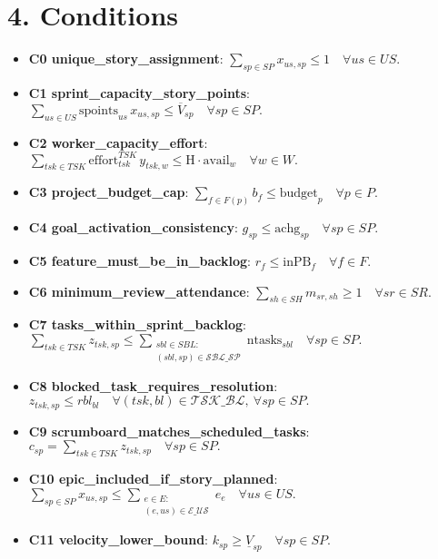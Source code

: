 \documentclass[11pt,a4paper]{article}
\begin{document}
\section{4. Conditions}
\begin{itemize}
  \item \textbf{C0 unique\_story\_assignment}: $\displaystyle \sum_{sp\in SP} x_{us,sp} \le 1\quad \forall us\in US.$
  \item \textbf{C1 sprint\_capacity\_story\_points}: $\displaystyle \sum_{us\in US} \text{spoints}_{us}\, x_{us,sp} \le \overline{V}_{sp}\quad \forall sp\in SP.$
  \item \textbf{C2 worker\_capacity\_effort}: $\displaystyle \sum_{tsk\in TSK} \text{effort}^{TSK}_{tsk}\, y_{tsk,w} \le \text{H}\cdot \text{avail}_w \quad \forall w\in W.$
  \item \textbf{C3 project\_budget\_cap}: $\displaystyle \sum_{f\in F(p)} b_f \le \text{budget}_p \quad \forall p\in P.$
  \item \textbf{C4 goal\_activation\_consistency}: $\displaystyle g_{sp} \le \text{achg}_{sp} \quad \forall sp\in SP.$
  \item \textbf{C5 feature\_must\_be\_in\_backlog}: $\displaystyle r_f \le \text{inPB}_f \quad \forall f\in F.$
  \item \textbf{C6 minimum\_review\_attendance}: $\displaystyle \sum_{sh\in SH} m_{sr,sh} \ge 1 \quad \forall sr\in SR.$
  \item \textbf{C7 tasks\_within\_sprint\_backlog}: $\displaystyle \sum_{tsk\in TSK} z_{tsk,sp} \le \sum_{\substack{sbl\in SBL:\\ (sbl,sp)\in \mathcal{SBL\_SP}}} \! \text{ntasks}_{sbl}\quad \forall sp\in SP.$
  \item \textbf{C8 blocked\_task\_requires\_resolution}: $\displaystyle z_{tsk,sp} \le rbl_{bl}\quad \forall (tsk,bl)\in \mathcal{TSK\_BL},\ \forall sp\in SP.$
  \item \textbf{C9 scrumboard\_matches\_scheduled\_tasks}: $\displaystyle c_{sp} = \sum_{tsk\in TSK} z_{tsk,sp}\quad \forall sp\in SP.$
  \item \textbf{C10 epic\_included\_if\_story\_planned}: $\displaystyle \sum_{sp\in SP} x_{us,sp} \le \sum_{\substack{e\in E:\\ (e,us)\in \mathcal{E\_US}}}\! e_{e}\quad \forall us\in US.$
  \item \textbf{C11 velocity\_lower\_bound}: $\displaystyle k_{sp} \ge \underline{V}_{sp}\quad \forall sp\in SP.$
\end{itemize}
\end{document}
